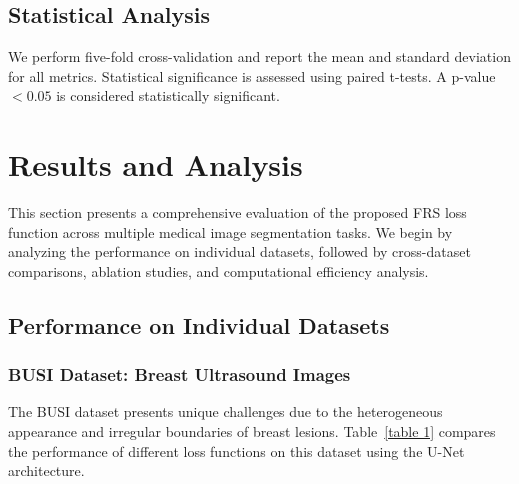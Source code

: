 \documentclass[review]{elsarticle}
\begin{document}
\subsection{Statistical Analysis}
We perform five-fold cross-validation and report the mean and standard deviation for all metrics. Statistical significance is assessed using paired t-tests. A p-value $< 0.05$ is considered statistically significant.

\section{Results and Analysis}\label{results}
This section presents a comprehensive evaluation of the proposed FRS loss function across multiple medical image segmentation tasks. We begin by analyzing the performance on individual datasets, followed by cross-dataset comparisons, ablation studies, and computational efficiency analysis.

\subsection{Performance on Individual Datasets}

\subsubsection{BUSI Dataset: Breast Ultrasound Images}
The BUSI dataset presents unique challenges due to the heterogeneous appearance and irregular boundaries of breast lesions. Table~\ref{table 1} compares the performance of different loss functions on this dataset using the U-Net architecture.
\end{document}

